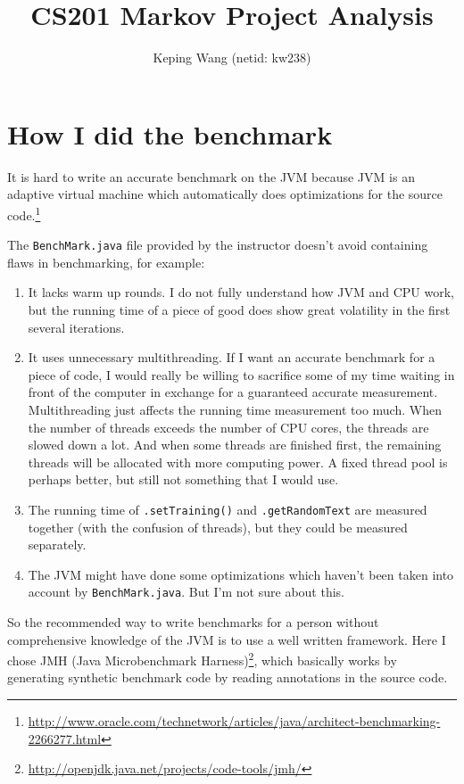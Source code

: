 \documentclass[11pt]{article}
\title{CS201 Markov Project Analysis}
\author{Keping Wang (netid: kw238)}
\begin{document}
\maketitle

\section{How I did the benchmark}
It is hard to write an accurate benchmark on the JVM because JVM is an adaptive virtual machine which automatically does optimizations for the source code.\footnote{\url{http://www.oracle.com/technetwork/articles/java/architect-benchmarking-2266277.html}}

The \texttt{BenchMark.java} file provided by the instructor doesn't avoid containing flaws in benchmarking, for example:
\begin{enumerate}
\item It lacks warm up rounds. I do not fully understand how JVM and CPU work, but the running time of a piece of good does show great volatility in the first several iterations.
\item It uses unnecessary multithreading. If I want an accurate benchmark for a piece of code, I would really be willing to sacrifice some of my time waiting in front of the computer in exchange for a guaranteed accurate measurement. Multithreading just affects the running time measurement too much. When the number of threads exceeds the number of CPU cores, the threads are slowed down a lot. And when some threads are finished first, the remaining threads will be allocated with more computing power. A fixed thread pool is perhaps better, but still not something that I would use.
\item The running time of \texttt{.setTraining()} and \texttt{.getRandomText} are measured together (with the confusion of threads), but they could be measured separately.
\item The JVM might have done some optimizations which haven't been taken into account by \texttt{BenchMark.java}. But I'm not sure about this.
\end{enumerate}

So the recommended way to write benchmarks for a person without comprehensive knowledge of the JVM is to use a well written framework. Here I chose JMH (Java Microbenchmark Harness)\footnote{\url{http://openjdk.java.net/projects/code-tools/jmh/}}, which basically works by generating synthetic benchmark code by reading annotations in the source code.
\end{document}
